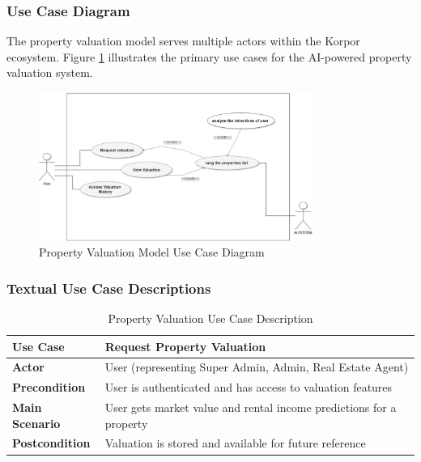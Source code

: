 \subsubsection{Use Case Diagram}
The property valuation model serves multiple actors within the Korpor ecosystem. Figure \ref{fig:valuation-use-case} illustrates the primary use cases for the AI-powered property valuation system.
\begin{figure}[htbp]
    \centering
    \includegraphics[width=0.8\textwidth]{images/valuation_use_case_diagram.png}
    \caption{Property Valuation Model Use Case Diagram}
    \label{fig:valuation-use-case}
\end{figure}

\subsubsection{Textual Use Case Descriptions}

\begin{table}[htbp]
    \centering
    \begin{tabular}{|p{3cm}|p{10cm}|}
        \hline
        \textbf{Use Case} & \textbf{Request Property Valuation} \\
        \hline
        \textbf{Actor} & User (representing Super Admin, Admin, Real Estate Agent) \\
        \hline
        \textbf{Precondition} & User is authenticated and has access to valuation features \\
        \hline
        \textbf{Main Scenario} & User gets market value and rental income predictions for a property \\
        \hline
        \textbf{Postcondition} & Valuation is stored and available for future reference \\
        \hline
    \end{tabular}
    \caption{Property Valuation Use Case Description}
    \label{tab:property-valuation-use-case}
\end{table}

